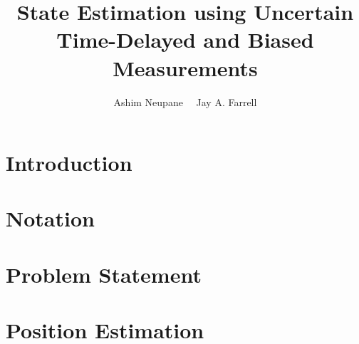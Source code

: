 
\usepackage{tikz}
\usepackage{wrapfig}
\usepackage{caption}
\usepackage{stfloats}
\DeclareMathAlphabet{}


\title{State Estimation using Uncertain Time-Delayed and Biased Measurements}
\author{Ashim Neupane \ \ Jay A. Farrell
}%

\maketitle

		
\section{Introduction}	
	
	
\section{Notation}	\label{sect:notation}
	

\section{Problem Statement}\label{sect:problem_statement}
	

\section{Position Estimation} \label{sect:position_estimation}
	
	
	

%
\clearpage

%

\clearpage




